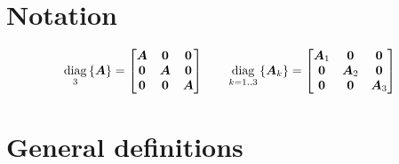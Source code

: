 \documentclass[12pt,a4paper]{article}
\begin{document}

\section{Notation}
\begin{equation*}
    \diag{3}{\M{A}} = 
    \begin{bmatrix}
        \M{A}   &   \M{0}   &   \M{0}\\
        \M{0}   &   \M{A}   &   \M{0}\\
        \M{0}   &   \M{0}   &   \M{A}\\
    \end{bmatrix}
    \quad\quad
    \diag{k = 1..3}{\M{A}_k} = 
    \begin{bmatrix}
        \M{A}_1 &   \M{0}   &   \M{0}\\
        \M{0}   &   \M{A}_2 &   \M{0}\\
        \M{0}   &   \M{0}   &   \M{A}_3\\
    \end{bmatrix}
\end{equation*}



\section{General definitions}

\end{document}
